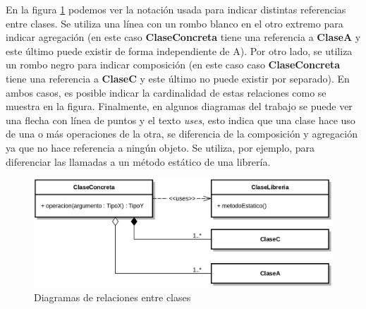 En la figura \ref{fig:png_diag_rel_clases} podemos ver la notación usada para indicar distintas referencias entre clases. Se utiliza una línea con un rombo blanco en el otro extremo para indicar agregación (en este caso \textbf{ClaseConcreta} tiene una referencia a \textbf{ClaseA} y este último puede existir de forma independiente de A). Por otro lado, se utiliza un rombo negro para indicar composición (en este caso caso \textbf{ClaseConcreta} tiene una referencia a \textbf{ClaseC} y este último no puede existir por separado). En ambos casos, es posible indicar la cardinalidad de estas relaciones como se muestra en la figura. Finalmente, en algunos diagramas del trabajo se puede ver una flecha con línea de puntos y el texto \emph{uses}, esto indica que una clase hace uso de una o más operaciones de la otra, se diferencia de la composición y agregación ya que no hace referencia a ningún objeto. Se utiliza, por ejemplo, para diferenciar las llamadas a un método estático de una librería.

\begin{figure}[H]
  	\centering
	\includegraphics[scale=0.17]{img/ref_comp-agregation.png}
	\caption{Diagramas de relaciones entre clases}
  	\label{fig:png_diag_rel_clases}
\end{figure}


